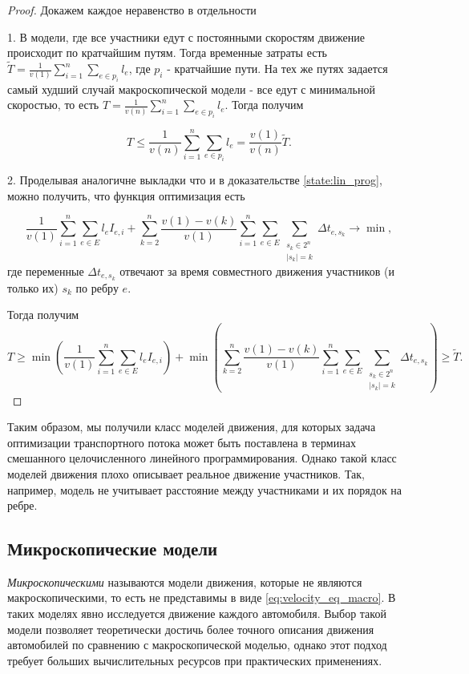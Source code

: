 \documentclass[12pt, a4paper]{article}
\DeclareMathOperator*{\minn}{min}
\begin{document}
\begin{proof}
	Докажем каждое неравенство в отдельности
	
	1. В модели, где все участники едут с постоянными скоростям движение происходит по кратчайшим путям. Тогда временные затраты есть $\widetilde{T} = \frac{1}{v(1)} \sum \limits _{i = 1} ^ n \sum\limits_{e \in p_i} l_e$, где $p_i$ - кратчайшие пути.
	На тех же путях задается самый худший случай макроскопической модели - все едут с минимальной скоростью, то есть $ T = \frac{1}{v(n)} \sum \limits _{i = 1} ^ n \sum\limits_{e \in p_i} l_e$. Тогда получим
	
	$$T \le  \frac{1}{v(n)} \sum \limits _{i = 1} ^ n \sum\limits_{e \in p_i} l_e = \frac {v(1)}{v(n)} \widetilde{T}.$$
	
	2. Проделывая аналогичне выкладки что и в доказательстве \ref{state:lin_prog}, можно получить, что функция оптимизация есть 
	
	$$ \frac{1}{v (1)} \sum\limits_{i = 1}^n \sum \limits _{e \in E} l_e I_{e, i} +  \sum\limits_{k = 2}^{n} \frac{v(1) - v(k)}{v (1)}  \sum\limits_{i = 1}^n \sum \limits _{e \in E} \sum\limits _{\substack{ s_k \in 2^n \\ |s_k| = k}}  \Delta t_{e, s_k} \rightarrow \minn ,$$
	где переменные $\Delta t_{e, s_k}$ отвечают за время совместного движения участников (и только их) $s_k$ по ребру $e$.
	
	Тогда получим
		$$T \ge 
		  \minn \left(  \frac{1}{v (1)} \sum\limits_{i = 1}^n \sum \limits _{e \in E} l_e I_{e, i} \right) 
		+ \minn \left(  \sum\limits_{k = 2}^{n} \frac{v(1) - v(k)}{v (1)}  \sum\limits_{i = 1}^n \sum \limits _{e \in E} \sum\limits _{\substack{ s_k \in 2^n \\ |s_k| = k}}  \Delta t_{e, s_k} \right) \ge \widetilde{T}.$$

\end{proof}

Таким образом, мы получили класс моделей движения, для которых задача оптимизации транспортного потока может быть поставлена в терминах смешанного целочисленного линейного программирования. Однако такой класс моделей движения плохо описывает реальное движение участников. Так, например, модель не учитывает расстояние между участниками и их порядок на ребре.

\subsection{Микроскопические модели}
\textit {Микроскопическими} называются модели движения, которые не являются макроскопическими, то есть не представимы в виде \eqref{eq:velocity_eq_macro}. В таких моделях явно исследуется движение каждого автомобиля.
Выбор такой модели позволяет теоретически достичь более точного описания движения автомобилей по сравнению с макроскопической моделью, однако этот подход требует больших вычислительных ресурсов при практических применениях.
\end{document}
